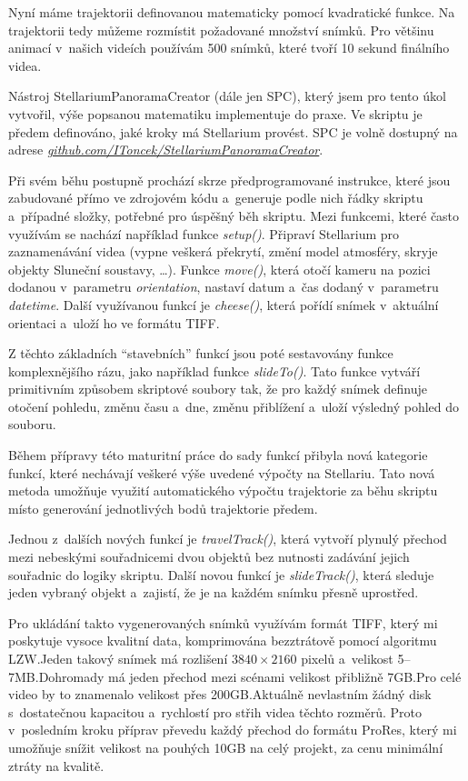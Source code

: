 \documentclass[12pt,a4paper,titlepage]{article}
\newcommand{\link}[2]{\href{#1}{\textit{#2}}}%
\begin{document}
Nyní máme trajektorii definovanou matematicky pomocí kvadratické funkce. Na trajektorii tedy můžeme rozmístit požadované množství snímků. Pro většinu animací v~našich videích používám 500 snímků, které tvoří 10 sekund finálního videa.

Nástroj StellariumPanoramaCreator (dále jen SPC), který jsem pro tento úkol vytvořil, výše popsanou matematiku implementuje do praxe. Ve skriptu je předem definováno, jaké kroky má Stellarium provést. SPC je volně dostupný na adrese \link{https://github.com/IToncek/StellariumPanoramaCreator}{github.com/IToncek/StellariumPanoramaCreator}. 

Při svém běhu postupně prochází skrze předprogramované instrukce, které jsou zabudované přímo ve zdrojovém kódu a~generuje podle nich řádky skriptu a~případné složky, potřebné pro úspěšný běh skriptu. Mezi funkcemi, které často využívám se nachází například funkce \textit{setup()}. Připraví Stellarium pro zaznamenávání videa (vypne veškerá překrytí, změní model atmosféry, skryje objekty Sluneční soustavy, \ldots). Funkce \textit{move()}, která otočí kameru na pozici dodanou v~parametru \textit{orientation}, nastaví datum a~čas dodaný v~parametru \textit{datetime}. Další využívanou funkcí je \textit{cheese()}, která pořídí snímek v~aktuální orientaci a~uloží ho ve formátu TIFF.%

Z těchto základních \enquote{stavebních} funkcí jsou poté sestavovány funkce komplexnějšího rázu, jako například funkce \textit{slideTo()}. Tato funkce vytváří primitivním způsobem skriptové soubory tak, že pro každý snímek definuje otočení pohledu, změnu času a~dne, změnu přiblížení a~uloží výsledný pohled do souboru. %

Během přípravy této maturitní práce do sady funkcí přibyla nová kategorie funkcí, které nechávají veškeré výše uvedené výpočty na Stellariu. Tato nová metoda umožňuje využití automatického výpočtu trajektorie za běhu skriptu místo generování jednotlivých bodů trajektorie předem. 

Jednou z~dalších nových funkcí je \textit{travelTrack()}, která vytvoří plynulý přechod mezi nebeskými souřadnicemi dvou objektů bez nutnosti zadávání jejich souřadnic do logiky skriptu. Další novou funkcí je \textit{slideTrack()}, která sleduje jeden vybraný objekt a~zajistí, že je na každém snímku přesně uprostřed. %

Pro ukládání takto vygenerovaných snímků využívám formát TIFF, který mi poskytuje vysoce kvalitní data, komprimována bezztrátově pomocí algoritmu LZW.\@ Jeden takový snímek má rozlišení \(3840\times2160\) pixelů a~velikost 5--7MB.\@ Dohromady má jeden přechod mezi scénami velikost přibližně 7GB.\@ Pro celé video by to znamenalo velikost přes 200GB.\@ Aktuálně nevlastním žádný disk s~dostatečnou kapacitou a~rychlostí pro střih videa těchto rozměrů. Proto v~posledním kroku příprav převedu každý přechod do formátu ProRes, který mi umožňuje snížit velikost na pouhých 10GB na celý projekt, za cenu minimální ztráty na kvalitě. 
\end{document}
